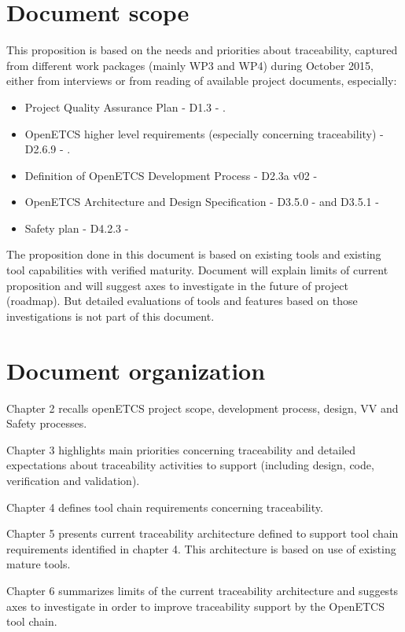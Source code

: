 \documentclass[11pt]{template/openetcs_report}
\begin{document}
\section{Document scope}
This proposition is based on the needs and priorities about traceability, captured from different work packages (mainly WP3 and WP4) during October 2015, either from interviews or from reading of available project documents, especially:
\begin{itemize} 
\item Project Quality Assurance Plan - D1.3 - \cite{qa-plan}.
\item OpenETCS higher level requirements (especially concerning traceability) - D2.6.9 - \cite{D2.6.9}.
\item Definition of OpenETCS Development Process - D2.3a v02 - \cite{D2.3a}
\item OpenETCS Architecture and Design Specification - D3.5.0 - \cite{D3.5.0}  and D3.5.1 - \cite{D3.5.3}
\item Safety plan - D4.2.3 - \cite{D4.2.3}
\end{itemize}

The proposition done in this document is based on existing tools and existing tool capabilities with verified maturity. Document will explain limits of current proposition and will suggest axes to investigate in the future of project (roadmap).
But detailed evaluations of tools and features based on those investigations is not part of this document.

\section{Document organization}
Chapter 2 recalls openETCS project scope, development process, design, VV and Safety processes.

Chapter 3 highlights main priorities concerning traceability and detailed expectations about traceability activities to support (including design, code, verification and validation).

Chapter 4 defines tool chain requirements concerning traceability.

Chapter 5 presents current traceability architecture defined to support tool chain requirements identified in chapter 4. This architecture is based on use of existing mature tools.

Chapter 6 summarizes limits of the current traceability architecture and suggests axes to investigate in order to improve traceability support by the OpenETCS tool chain.
\end{document}
